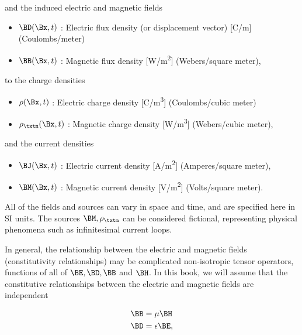 and the induced electric and magnetic fields

\begin{itemize}
	\item \( \BD(\Bx, t) \) : Electric flux density (or displacement vector) [\si{C/m}] (Coulombs/meter)
	\item \( \BB(\Bx, t) \) : Magnetic flux density [\si{W/m^2}] (Webers/square meter),
\end{itemize}

to the charge densities

\begin{itemize}
	\item \( \rho(\Bx, t) \) : Electric charge density [\si{C/m^3}] (Coulombs/cubic meter)
   \item \( \rho_\txtm(\Bx, t) \) : Magnetic charge density [\si{W/m^3}] (Webers/cubic meter),
\end{itemize}

and the current densities

\begin{itemize}
	\item \( \BJ(\Bx, t) \) : Electric current density [\si{A/m^2}] (Amperes/square meter),
   \item \( \BM(\Bx, t) \) : Magnetic current density [\si{V/m^2}] (Volts/square meter).
\end{itemize}

All of the fields and sources can vary in space and time, and are specified here in SI units.
The sources \( \BM, \rho_\txtm \) can be considered fictional, representing physical phenomena such as infinitesimal current loops.

In general, the relationship between the electric and magnetic fields (constitutivity relationships) may be complicated
non-isotropic tensor operators, functions of all of \( \BE, \BD, \BB \) and \( \BH \).
In this book, we will assume that the constitutive relationships between the electric and magnetic fields are independent

\index{\(\mu\)}
\index{\(\epsilon\)}
\begin{equation}\label{eqn:freespace:300}
\begin{aligned}
\BB &= \mu \BH \\
\BD &= \epsilon \BE,
\end{aligned}
\end{equation}

